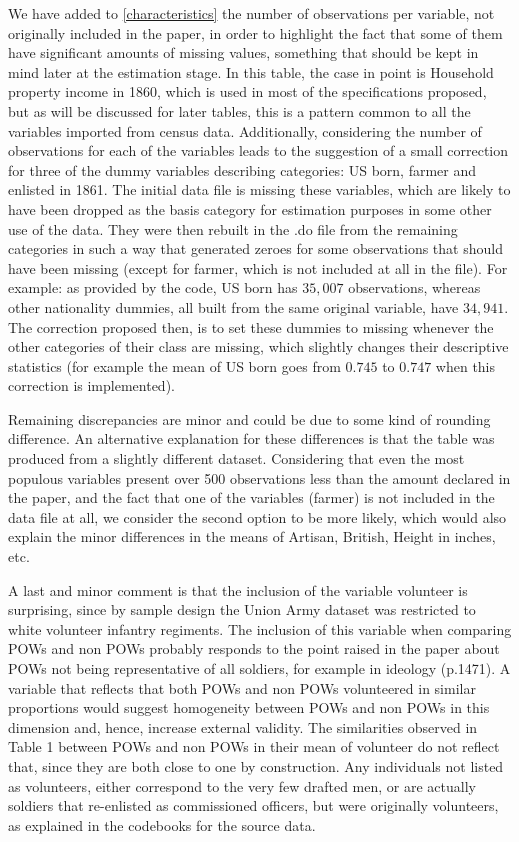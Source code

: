 \documentclass[a4paper]{report}\usepackage{graphicx, color}
\begin{document}
\begin{refsection}
We have added to \autoref{characteristics} the number of observations per variable, not originally included in the paper, in order to highlight the fact that some of them have significant amounts of missing values, something that should be kept in mind later at the estimation stage. In this table, the case in point is Household property income in 1860, which is used in most of the specifications proposed, but as will be discussed for later tables, this is a pattern common to all the variables imported from census data. 
Additionally, considering the number of observations for each of the variables leads to the suggestion of a small correction for three of the dummy variables describing categories: US born, farmer and enlisted in 1861. The initial data file is missing these variables, which are likely to have been dropped as the basis category for estimation purposes in some other use of the data. They were then rebuilt in the .do file from the remaining categories in such a way that generated zeroes for some observations that should have been missing (except for farmer, which is not included at all in the file). For example: as provided by the code, US born has $35,007$ observations, whereas other nationality dummies, all built from the same original variable, have $34,941$. The correction proposed then, is to set these dummies to missing whenever the other categories of their class are missing, which slightly changes their descriptive statistics (for example the mean of US born goes from $0.745$ to $0.747$ when this correction is implemented).

Remaining discrepancies are minor and could be due to some kind of rounding difference. An alternative explanation for these differences is that the table was produced from a slightly different dataset. Considering that even the most populous variables present over 500 observations less than the amount declared in the paper, and the fact that one of the variables (farmer) is not included in the data file at all, we consider the second option to be more likely, which would also explain the minor differences in the means of Artisan, British, Height in inches, etc.

A last and minor comment is that the inclusion of the variable volunteer is surprising, since by sample design the Union Army dataset was restricted to white volunteer infantry regiments. The inclusion of this variable when comparing POWs and non POWs probably responds to the point raised in the paper about POWs not being representative of all soldiers, for example in ideology (p.1471). A variable that reflects that both POWs and non POWs volunteered in similar proportions would suggest homogeneity between POWs and non POWs in this dimension and, hence, increase  external validity. The similarities observed in Table 1 between POWs and non POWs in their mean of volunteer do not reflect that, since they are both close to one by construction. Any individuals not listed as volunteers, either correspond to the very few drafted men, or are actually soldiers that re-enlisted as commissioned officers, but were originally volunteers, as explained in the codebooks for the source data.


\end{refsection}
\end{document}
